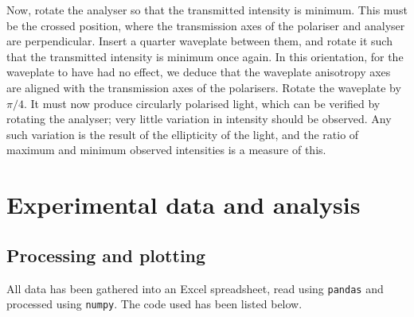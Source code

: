 \documentclass[11pt]{article}
\begin{document}
        Now, rotate the analyser so that the transmitted intensity is minimum. This must be the crossed position, where the transmission axes
        of the polariser and analyser are perpendicular. Insert a quarter waveplate between them, and rotate it such that the transmitted intensity
        is minimum once again. In this orientation, for the waveplate to have had no effect, we deduce that the waveplate anisotropy axes
        are aligned with the transmission axes of the polarisers. Rotate the waveplate by $\pi /4$. It must now produce circularly polarised light,
        which can be verified by rotating the analyser; very little variation in intensity should be observed.
        Any such variation is the result of the ellipticity of the light, and the ratio of maximum and minimum observed intensities is a measure of this.

        
        \section{Experimental data and analysis}
        
        \subsection{Processing and plotting}
        All data has been gathered into an Excel spreadsheet, read using \texttt{pandas} and processed using \texttt{numpy}.
        The code used has been listed below.
        
        
\end{document}

